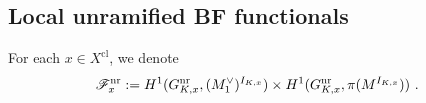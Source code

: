 \documentclass[a4paper]{amsart}
\theoremstyle{definition}
\numberwithin{equation}{section}
\begin{document}
\subsection{Local unramified BF functionals}\label{Localthy-BFnr}

For each $x\in X^\mathrm{cl}$, we denote
\begin{eqnarray}\label{fnr}
     \mathscr{F}_x^\mathrm{nr}&:=H^1(G_{K,x}^\mathrm{nr},(M_1^\vee)^{I_{K,x}})\times H^1(G_{K,x}^\mathrm{nr},\pi(M^{I_{K,x}}))\rlap{\ .}
\end{eqnarray}

\end{document}
